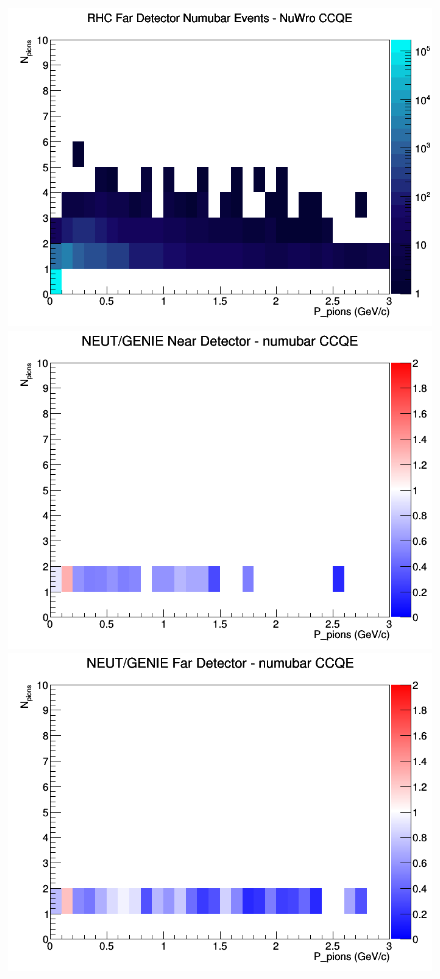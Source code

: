 \documentclass[12pt]{article}
\begin{document}
\begin{figure}[h]
\endminipage
{}
\includegraphics[width=\linewidth]{N_P/nominal/pions/CCQE_RHC_FD_numubar_N_P_NuWro.png}
\endminipage
\newline
{}
\includegraphics[width=\linewidth]{N_P/nominal/pions/ratios/CCQE_NEUT_GENIE_numubar_near_N_P.png}
\endminipage
{}
\includegraphics[width=\linewidth]{N_P/nominal/pions/ratios/CCQE_NEUT_GENIE_numubar_far_N_P.png}

\end{figure}
\end{document}

